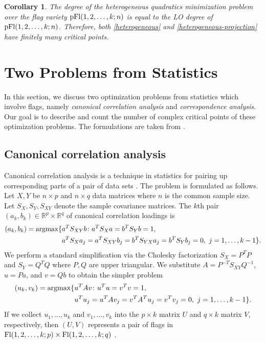 \documentclass[12pt]{extarticle}
\newtheorem{corollary}[theorem]{Corollary}
\theoremstyle{definition}
\numberwithin{theorem}{section}
\newcommand{\RR}{\mathbb{R}}
\begin{document}
\begin{corollary}
    The degree of the heterogeneous quadratics minimization problem over the  flag variety ${\rm pFl}(1, 2, \ldots, k; n)$ is equal to the LO degree of ${\rm pFl}(1, 2, \ldots, k; n)$. 
    Therefore, both \eqref{heterogeneous} and \eqref{heterogeneous-projection}
 have finitely many critical points. 
 \end{corollary}

\section{Two Problems from Statistics}\label{sec:statisticsproblems}
In this section, we discuss two  optimization problems from statistics which involve flags, namely \emph{canonical correlation analysis} and \emph{correspondence analysis}. Our goal is to describe and count the number of complex critical points of these optimization problems. 
The formulations are taken from \cite[Section 1.2]{YWL}.

\subsection{Canonical correlation analysis}
Canonical correlation analysis is a technique in statistics for pairing up corresponding parts of a pair of data sets \cite{MKB}. 
The problem is formulated as follows. 
Let $X, Y$ be $n \times p$ and $n \times q$ data matrices where $n$ is the common sample size.
Let $S_X, S_Y, S_{XY}$ denote the sample covariance matrices. 
The $k$th pair $(a_k,b_k) \in \RR^p \times \RR^q$ of canonical correlation loadings is 
\begin{align*}
    (a_k, b_k) = {\rm argmax}\{&a^T S_{XY}b
    \colon a^T S_X a = b^T S_Y b = 1, \\
    &a^T S_X a_j = a^T S_{XY} b_j 
    = b^T S_{YX} a_j = b^T S_Y b_j = 0, 
    \, \, j  = 1, \ldots, k-1\}.
\end{align*}
We perform a standard simplification via the Cholesky factorization $S_X = P^TP$ and $S_Y = Q^TQ$ where $P, Q$ are upper triangular. 
We substitute $A = P^{-T} S_{XY} Q^{-1}$, $u = Pa$, and $v = Qb$ to obtain the simpler problem 
\begin{align*}    
    (u_k, v_k) = {\rm argmax}\{&u^T A v
    \colon u^Tu = v^Tv = 1, \\ \nonumber
    &u^Tu_j = u^T A v_j 
    = v^T A^T u_j = v^Tv_j = 0, 
    \, \, j  = 1, \ldots, k-1\}.
\end{align*}
If we collect $u_1, \ldots, u_k$ and $v_1, \ldots, v_k$ into the $p \times k$ matrix $U$ and $q \times k$ matrix $V$, respectively, then $(U, V)$ represents a pair of flags in ${\rm Fl}(1,2, \ldots, k;p) \times {\rm Fl}(1,2, \ldots, k;q)$ \cite{YWL}.
\end{document}
